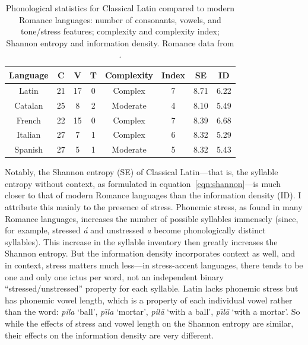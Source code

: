 \documentclass[12pt,twoside]{article}
\begin{document}
\begin{table}[h]
\centering
\caption{Phonological statistics for Classical Latin compared to modern Romance languages: number of consonants, vowels, and tone/stress features; complexity and complexity index; Shannon entropy and information density. Romance data from \cite[44-45]{oh}.}
\label{tab:phono}

\vspace{2ex}

\begin{tabular}{|c|c|c|c|c|c|c|c|}
\hline
\textbf{Language} & \textbf{C} & \textbf{V} & \textbf{T} & \textbf{Complexity} & \textbf{Index} & \textbf{SE} & \textbf{ID} \\\hline
Latin & 21 & 17 & 0 & Complex & 7 & 8.71 & 6.22 \\\hline
Catalan & 25 & 8 & 2 & Moderate & 4 & 8.10 & 5.49 \\\hline
French & 22 & 15 & 0 & Complex & 7 & 8.39 & 6.68 \\\hline
Italian & 27 & 7 & 1 & Complex & 6 & 8.32 & 5.29 \\\hline
Spanish & 27 & 5 & 1 & Moderate & 5 & 8.32 & 5.43 \\\hline
\end{tabular}
\end{table}

Notably, the Shannon entropy (SE) of Classical Latin---that is, the syllable entropy without context, as formulated in equation~\ref{eqn:shannon}---is much closer to that of modern Romance languages than the information density (ID). I attribute this mainly to the presence of stress. Phonemic stress, as found in many Romance languages, increases the number of possible syllables immensely (since, for example, stressed \emph{\'a} and unstressed \emph{a} become phonologically distinct syllables). This increase in the syllable inventory then greatly increases the Shannon entropy. But the information density incorporates context as well, and in context, stress matters much less---in stress-accent languages, there tends to be one and only one ictus per word, not an independent binary ``stressed/unstressed'' property for each syllable. Latin lacks phonemic stress but has phonemic vowel length, which is a property of each individual vowel rather than the word: \emph{pila} `ball', \emph{p\=\i{}la} `mortar', \emph{pil\=a} `with a ball', \emph{p\=\i{}l\=a} `with a mortar'. So while the effects of stress and vowel length on the Shannon entropy are similar, their effects on the information density are very different.
\end{document}
